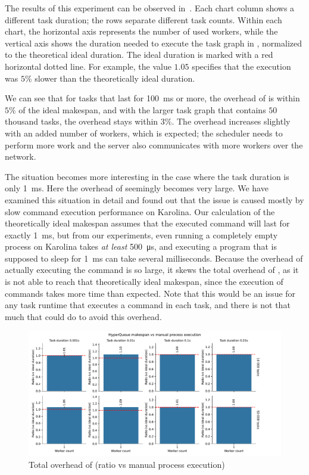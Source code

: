The results of this experiment can be observed in~. Each chart column shows
a different task duration; the rows separate different task counts. Within each chart, the
horizontal axis represents the number of used workers, while the vertical axis shows the duration
needed to execute the task graph in \hyperqueue{}, normalized to the theoretical ideal
duration. The ideal duration is marked with a red horizontal dotted line. For example, the value
$1.05$ specifies that the \hyperqueue{} execution was
$5\%$ slower than the theoretically ideal duration.

We can see that for tasks that last for \SI{100}{\milli\second} or more, the overhead of
\hyperqueue{} is within $5\%$ of the ideal makespan, and with the larger
task graph that contains $50$ thousand tasks, the overhead stays within
$3\%$. The overhead increases slightly with an added number of workers, which is
expected; the scheduler needs to perform more work and the server also communicates with more
workers over the network.

The situation becomes more interesting in the case where the task duration is only
\SI{1}{\milli\second}. Here the overhead of \hyperqueue{} seemingly becomes very large.
We have examined this situation in detail and found out that the issue is caused mostly by slow
command execution performance on Karolina. Our calculation of the theoretically ideal makespan
assumes that the executed command will last for exactly \SI{1}{\milli\second}, but from our
experiments, even running a completely empty process on Karolina takes \emph{at least}
\SI{500}{\micro\second}, and executing a program that is supposed to sleep for
\SI{1}{\milli\second} can take several milliseconds. Because the overhead of actually executing
the command is so large, it skews the total overhead of \hyperqueue{}, as it is not able
to reach that theoretically ideal makespan, since the execution of commands takes more time than
expected. Note that this would be an issue for any task runtime that executes a command in each
task, and there is not that much that \hyperqueue{} could do to avoid this overhead.

\begin{figure}[h]
	\centering
	\includegraphics[width=\textwidth]{imgs/hq/charts/total-overhead-vs-manual}
	\caption{Total overhead of \hyperqueue{} (ratio vs manual process execution)}
	\label{fig:hq-overhead-vs-manual}
\end{figure}

